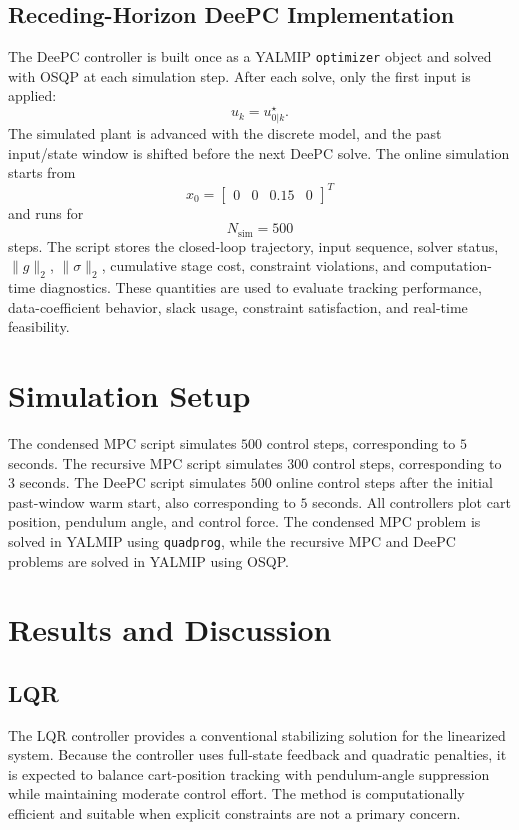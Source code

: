 \documentclass[conference]{IEEEtran}
\begin{document}
\subsection{Receding-Horizon DeePC Implementation}
The DeePC controller is built once as a YALMIP \texttt{optimizer} object and solved with OSQP at each simulation step. After each solve, only the first input is applied:
\[
u_k=u_{0|k}^{\star}.
\]
The simulated plant is advanced with the discrete model, and the past input/state window is shifted before the next DeePC solve. The online simulation starts from
\[
x_0 =
\begin{bmatrix}
0 & 0 & 0.15 & 0
\end{bmatrix}^{T}
\]
and runs for
\[
N_{\mathrm{sim}}=500
\]
steps. The script stores the closed-loop trajectory, input sequence, solver status, $\|g\|_2$, $\|\sigma\|_2$, cumulative stage cost, constraint violations, and computation-time diagnostics. These quantities are used to evaluate tracking performance, data-coefficient behavior, slack usage, constraint satisfaction, and real-time feasibility.

\section{Simulation Setup}
The condensed MPC script simulates $500$ control steps, corresponding to $5$ seconds. The recursive MPC script simulates $300$ control steps, corresponding to $3$ seconds. The DeePC script simulates $500$ online control steps after the initial past-window warm start, also corresponding to $5$ seconds. All controllers plot cart position, pendulum angle, and control force. The condensed MPC problem is solved in YALMIP using \texttt{quadprog}, while the recursive MPC and DeePC problems are solved in YALMIP using OSQP.

\section{Results and Discussion}
\subsection{LQR}
The LQR controller provides a conventional stabilizing solution for the linearized system. Because the controller uses full-state feedback and quadratic penalties, it is expected to balance cart-position tracking with pendulum-angle suppression while maintaining moderate control effort. The method is computationally efficient and suitable when explicit constraints are not a primary concern.
\end{document}

